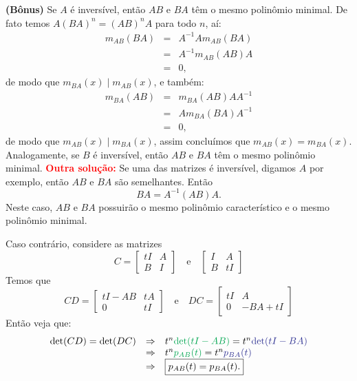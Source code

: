 \documentclass[11pt,a4paper]{article}
\begin{document}
{{\task[\pers{d}] \textbf{(Bônus)} Se $A$ é inversível, então $AB$ e $BA$ têm o mesmo polinômio minimal. De fato temos $A(BA)^n=(AB)^nA$ para todo $n$, aí:
\[
\begin{array}{rcl}
m_{AB}(BA)&=&A^{-1}Am_{AB}(BA)\\&=&A^{-1}m_{AB}(AB)A\\&=&0,
\end{array}
\]
de modo que $m_{BA}(x)\mid m_{AB}(x)$, e também:
\[
\begin{array}{rcl}
m_{BA}(AB)&=&m_{BA}(AB)AA^{-1}\\&=&Am_{BA}(BA)A^{-1}\\&=&0,
\end{array}
\]
de modo que $m_{AB}(x)\mid m_{BA}(x)$, assim concluímos que $m_{AB}(x)=m_{BA}(x)$. Analogamente, se $B$ é inversível, então $AB$ e $BA$ têm o mesmo polinômio minimal.
}
\textbf{\textcolor{Red}{Outra solução:}} Se uma das matrizes é inversível, digamos $A$ por exemplo, então $AB$ e $BA$ são semelhantes. Então \[BA = A^{-1}(AB)A.\]
Neste caso, $AB$ e $BA$ possuirão o mesmo polinômio característico e o mesmo polinômio minimal.

Caso contrário, considere as matrizes
\[
C = \begin{bmatrix}
tI & A \\ B & I
\end{bmatrix} \quad \mbox{e} \quad \begin{bmatrix}
I & A \\ B & tI
\end{bmatrix}
\]
Temos que
\[
CD =  \begin{bmatrix}
tI-AB & tA \\ 0 & tI
\end{bmatrix}   \quad \mbox{e} \quad DC = \begin{bmatrix}
tI & A \\ 0 & -BA + tI
\end{bmatrix} 
\]
Então veja que:
\[
\begin{array}{rcl}
\det(CD) = \det(DC) &\Rightarrow& t^n \textcolor{Green}{\det(tI - AB)} = t^n \textcolor{Blue}{\det(tI-BA)} \\&\Rightarrow& t^n \textcolor{Green}{p_{AB}(t)} = t^n \textcolor{Blue}{p_{BA}(t)} \\&\Rightarrow& \boxed{p_{AB}(t) = p_{BA}(t).}
\end{array}
\]
}
\end{document}
